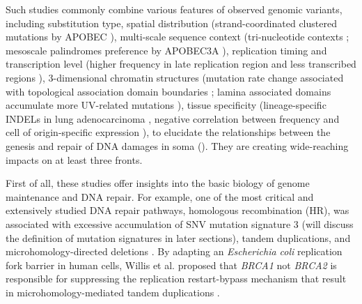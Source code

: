 \documentclass[phd,tocprelim]{cornell}
\begin{document}
Such studies commonly combine various features of observed genomic variants, including substitution type, spatial distribution (strand-coordinated clustered mutations by APOBEC \cite{Shi2017-cd}), multi-scale sequence context (tri-nucleotide contexts \cite{alexandrov2013}; mesoscale palindromes preference by APOBEC3A \cite{Buisson2019-ue}), replication timing and transcription level (higher frequency in late replication region and less transcribed regions \cite{Lawrence2013-zx}), 3-dimensional chromatin structures (mutation rate change associated with topological association domain boundaries \cite{Akdemir2020-hn}; lamina associated domains accumulate more UV-related mutations \cite{Garcia-Nieto2017-ox}), tissue specificity (lineage-specific INDELs in lung adenocarcinoma \cite{imielinski2017}, negative correlation between frequency and cell of origin-specific expression \cite{polak2015}), to elucidate the relationships between the genesis and repair of DNA damages in soma (\cite{Zou2021-je,Volkova2020-zg,Vohringer2021-bv}). They are creating wide-reaching impacts on at least three fronts.

First of all, these studies offer insights into the basic biology of genome maintenance and DNA repair. For example, one of the most critical and extensively studied DNA repair pathways, homologous recombination (HR), was associated with excessive accumulation of SNV mutation signature 3 (will discuss the definition of mutation signatures in later sections), tandem duplications, and microhomology-directed deletions \cite{Nik-Zainal2016-bz}. By adapting an \textit{Escherichia coli} replication fork barrier in human cells, Willis et al. proposed that \textit{BRCA1} not \textit{BRCA2} is responsible for suppressing the replication restart-bypass mechanism that result in microhomology-mediated tandem duplications \cite{Willis2017-bw}.
\end{document}
